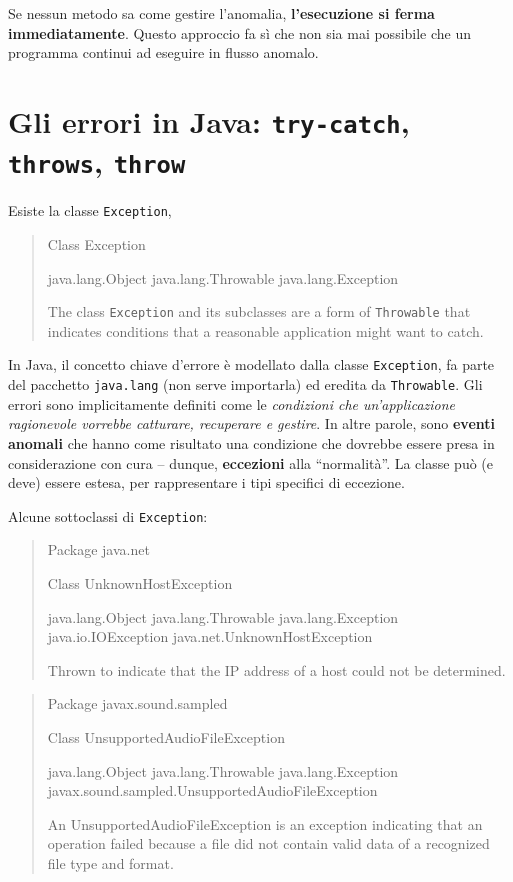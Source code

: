 \documentclass[\fontsizeclass,twocolumn]{\classname}
\theoremstyle{definition}
\theoremstyle{definition}
\begin{document}
Se nessun metodo sa come gestire l'anomalia, \textbf{l'esecuzione si ferma
immediatamente}. Questo approccio fa sì che non sia mai possibile che un
programma continui ad eseguire in flusso anomalo.

\section{Gli errori in Java: \texttt{try\--catch}, \texttt{throws}, \texttt{throw}}

Esiste la classe \texttt{Exception},
\begin{quote}
    \footnotesize{Class Exception

java.lang.Object
java.lang.Throwable
java.lang.Exception

The class \texttt{Exception} and its subclasses are a form of
\texttt{Throwable} that indicates conditions that a reasonable application
might want to catch.
}
\end{quote}

In Java, il concetto chiave d'errore è modellato dalla classe
\texttt{Exception}, fa parte del pacchetto \texttt{java.lang} (non serve
importarla) ed eredita da \texttt{Throwable}. Gli errori sono implicitamente
definiti come le \emph{condizioni che un'applicazione ragionevole vorrebbe
catturare, recuperare e gestire}. In altre parole, sono \textbf{eventi anomali}
che hanno come risultato una condizione che dovrebbe essere presa in
considerazione con cura -- dunque, \textbf{eccezioni} alla ``normalità''. La
classe può (e deve) essere estesa, per rappresentare i tipi specifici di
eccezione.

Alcune sottoclassi di \texttt{Exception}:
\begin{quote}
    \footnotesize{Package java.net

Class UnknownHostException

java.lang.Object
java.lang.Throwable
java.lang.Exception
java.io.IOException
java.net.UnknownHostException

Thrown to indicate that the IP address of a host could not be determined.
}
\end{quote}

\begin{quote}
    \footnotesize{Package javax.sound.sampled

Class UnsupportedAudioFileException

java.lang.Object
java.lang.Throwable
java.lang.Exception
javax.sound.sampled.UnsupportedAudioFileException

An UnsupportedAudioFileException is an exception indicating that an operation
failed because a file did not contain valid data of a recognized file type and
format.
}
\end{quote}
\end{document}

